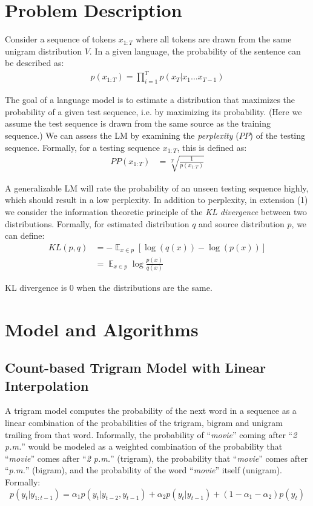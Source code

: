 \documentclass[11pt]{article}
\DeclareMathOperator*{\E}{\mathbb{E}}
\begin{document}
\section{Problem Description}

Consider a sequence of tokens $x_{1:T}$ where all tokens are drawn from the same unigram distribution $V$. In a given language, the probability of the sentence can be described as:
\begin{align*}
  p(x_{1:T}) = \prod_{i=1}^{T} p(x_{T} | x_1 ... x_{T-1})
\end{align*}

The goal of a language model is to estimate a distribution that maximizes the probability of a given test sequence, i.e. by maximizing its probability. (Here we assume the test sequence is drawn from the same source as the training sequence.) We can assess the LM by examining the \textit{perplexity} ($PP$) of the testing sequence. Formally, for a testing sequence $x_{1:T}$, this is defined as:
\begin{align*}
  PP(x_{1:T}) &= \sqrt[T]{\frac{1}{p(x_{1:T})}}
\end{align*}

A generalizable LM will rate the probability of an unseen testing sequence highly, which should result in a low perplexity. In addition to perplexity, in extension (1) we consider the information theoretic principle of the \textit{KL divergence} between two distributions. Formally, for estimated distribution $q$ and source distribution $p$, we can define:
\begin{align*}
  KL(p,q) &= - \E_{x\in p} [\log(q(x)) - \log(p(x))] \\
  &= \E_{x\in p} \log \frac{p(x)}{q(x)}
\end{align*}

KL divergence is 0 when the distributions are the same.

\section{Model and Algorithms}

\subsection{Count-based Trigram Model with Linear Interpolation}

A trigram model computes the probability of the next word in a sequence as a linear combination of the probabilities of the trigram, bigram and unigram trailing from that word. Informally, the probability of ``\textit{movie}'' coming after ``\textit{2 p.m.}'' would be modeled as a weighted combination of the probability that ``\textit{movie}'' comes after ``\textit{2 p.m.}'' (trigram), the probability that ``\textit{movie}'' comes after ``\textit{p.m.}'' (bigram), and the probability of the word ``\textit{movie}'' itself (unigram). Formally:
$$ p(y_t | y_{1:t-1}) =  \alpha_1 p(y_t | y_{t-2}, y_{t-1}) + \alpha_2 p(y_t | y_{t-1}) + (1 - \alpha_1 - \alpha_2) p(y_t) $$
\end{document}
